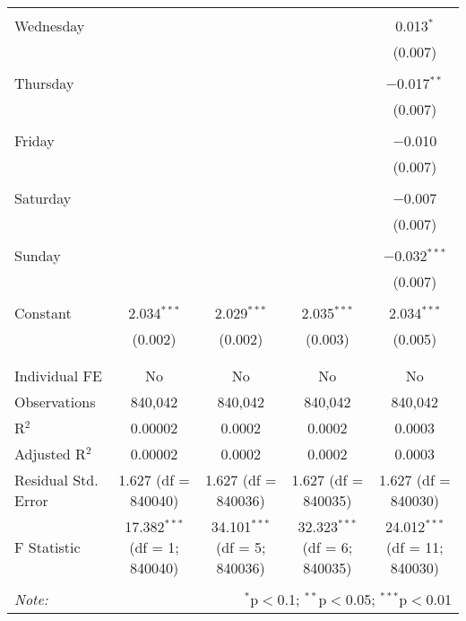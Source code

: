 \documentclass[
]{article}
\begin{document}
\begin{table}[!htbp]
{\begin{tabular}{@{\extracolsep{5pt}}lcccc}
  & & & & \\ 
 Wednesday &  &  &  & 0.013$^{*}$ \\ 
  &  &  &  & (0.007) \\ 
  & & & & \\ 
 Thursday &  &  &  & $-$0.017$^{**}$ \\ 
  &  &  &  & (0.007) \\ 
  & & & & \\ 
 Friday &  &  &  & $-$0.010 \\ 
  &  &  &  & (0.007) \\ 
  & & & & \\ 
 Saturday &  &  &  & $-$0.007 \\ 
  &  &  &  & (0.007) \\ 
  & & & & \\ 
 Sunday &  &  &  & $-$0.032$^{***}$ \\ 
  &  &  &  & (0.007) \\ 
  & & & & \\ 
 Constant & 2.034$^{***}$ & 2.029$^{***}$ & 2.035$^{***}$ & 2.034$^{***}$ \\ 
  & (0.002) & (0.002) & (0.003) & (0.005) \\ 
  & & & & \\ 
\hline \\[-1.8ex] 
Individual FE & No & No & No & No \\ 
Observations & 840,042 & 840,042 & 840,042 & 840,042 \\ 
R$^{2}$ & 0.00002 & 0.0002 & 0.0002 & 0.0003 \\ 
Adjusted R$^{2}$ & 0.00002 & 0.0002 & 0.0002 & 0.0003 \\ 
Residual Std. Error & 1.627 (df = 840040) & 1.627 (df = 840036) & 1.627 (df = 840035) & 1.627 (df = 840030) \\ 
F Statistic & 17.382$^{***}$ (df = 1; 840040) & 34.101$^{***}$ (df = 5; 840036) & 32.323$^{***}$ (df = 6; 840035) & 24.012$^{***}$ (df = 11; 840030) \\ 
\hline 
\hline \\[-1.8ex] 
\textit{Note:}  & \multicolumn{4}{r}{$^{*}$p$<$0.1; $^{**}$p$<$0.05; $^{***}$p$<$0.01} \\ 
\end{tabular}
} 
\end{table} 
\newpage
\end{document}

